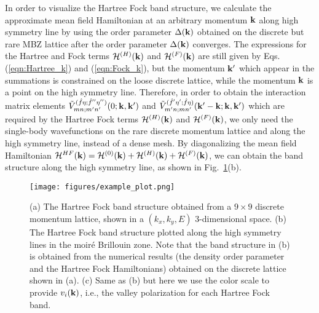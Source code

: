 \documentclass[prb,aps,nofootinbib,amssymb,twocolumn,superscriptaddress,10pt]{revtex4-2}
\begin{document}
\begin{widetext}
In order to visualize the Hartree Fock band structure, we calculate the approximate mean field Hamiltonian at an arbitrary momentum $\mathbf{k}$ along high symmetry line by using the order parameter $\Delta(\mathbf{k})$ obtained on the discrete but rare MBZ lattice after the order parameter $\Delta(\mathbf{k})$ converges. The expressions for the Hartree and Fock terms $\mathcal{H}^{(H)}(\mathbf{k})$ and $\mathcal{H}^{(F)}(\mathbf{k})$ are still given by Eqs. (\ref{eqn:Hartree_k}) and (\ref{eqn:Fock_k}), but the momentum $\mathbf{k}'$ which appear in the summations is constrained on the loose discrete lattice, while the momentum $\mathbf{k}$ is a point on the high symmetry line. Therefore, in order to obtain the interaction matrix elements $\tilde{V}^{(\hat{f}\eta;\hat{f}''\eta'')}_{mn;m'n'}(0; \mathbf{k},\mathbf{k}')$ and $\tilde{V}^{(\hat{f}'\eta';\hat{f}\eta)}_{m'n;mn'}(\mathbf{k}'-\mathbf{k};\mathbf{k},\mathbf{k}')$ which are required by the Hartree Fock terms $\mathcal{H}^{(H)}(\mathbf{k})$ and $\mathcal{H}^{(F)}(\mathbf{k})$, we only need the single-body wavefunctions on the 
rare discrete momentum lattice and along the high symmetry line, instead of a dense mesh. By diagonalizing the mean field Hamiltonian $\mathcal{H}^{HF}(\mathbf{k}) = \mathcal{H}^{(0)}(\mathbf{k}) + \mathcal{H}^{(H)}(\mathbf{k}) + \mathcal{H}^{(F)}(\mathbf{k})$, we can obtain the band structure along the high symmetry line, as shown in Fig.~\ref{fig:examples_plots}(b).

\begin{figure}[!htbp]
	\centering
	\texttt{[image: figures/example\_plot.png]}
	\caption{(a) The Hartree Fock band structure obtained from a $9\times9$ discrete momentum lattice, shown in a $(k_x, k_y, E)$ 3-dimensional space. (b) The Hartree Fock band structure plotted along the high symmetry lines in the moir\'e Brillouin zone. Note that the band structure in (b) is obtained from the numerical results (the density order parameter and the Hartree Fock Hamiltonians) obtained on the discrete lattice shown in (a). (c) Same as (b) but here we use the color scale to provide $v_i(\mathbf{k})$, i.e., the valley polarization for each Hartree Fock band.}
	\label{fig:examples_plots}
\end{figure}


\end{widetext}
\end{document}
